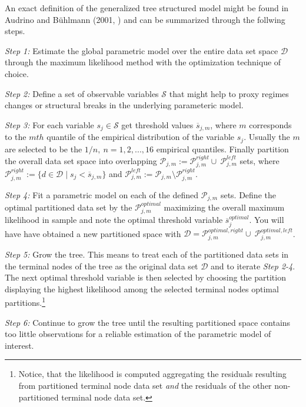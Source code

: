 An exact definition of the generalized tree structured
model might be found in Audrino and B{\"u}hlmann (2001,
\cite{AudrinoBuhlmann}) and can be summarized through the follwing
steps.\\

\setlength{\leftskip}{1cm}
\setlength{\rightskip}{1cm}

\textit{Step 1:} Estimate the global parametric model over the entire
data set space $\mathcal{D}$ through the maximum likelihood method
with the optimization technique of choice.

\textit{Step 2:} Define a set of observable variables $\mathcal{S}$
that might help to proxy regimes changes or structural breaks in the
underlying parameteric model.

\textit{Step 3:} For each variable $s_j \in \mathcal{S}$
get threshold values $\overline{s}_{j,m}$, where $m$ corresponds to
the $mth$ quantile of the empirical distribution of the variable $s_j$.
Usually the $m$ are selected to be the $1/n, \ n = 1, 2, ..., 16$
empirical quantiles. Finally partition the overall data set space into
overlapping
$\mathcal{P}_{j,m} := \mathcal{P}_{j,m}^{right} \cup \
\mathcal{P}_{j,m}^{left}$ sets, where
$\mathcal{P}_{j,m}^{right}:= \{d \in \mathcal{D} \mid s_j <
\overline{s}_{j,m}\}$ and
$\mathcal{P}_{j,m}^{left} := \mathcal{P}_{j,m} \setminus
\mathcal{P}_{j,m}^{right}$.

\textit{Step 4:} Fit a parametric model on each of the defined
$\mathcal{P}_{j,m}$ sets. Define the optimal partitioned data set by
the $\mathcal{P}_{j,m}^{optimal}$ maximizing the overall maximum likelihood in
sample and note the optimal threshold variable $\overline{s}_j^{optimal}$. You
will have have obtained a new partitioned space with
$\mathcal{D} = \mathcal{P}_{j,m}^{optimal, right} \cup \
\mathcal{P}_{j,m}^{optimal, left}$.

\textit{Step 5:} Grow the tree. This means to treat each of the
partitioned data sets in the terminal nodes of the tree as the
original data set $\mathcal{D}$ and to iterate \textit{Step 2-4}. The
next optimal threshold variable is then selected by choosing the
partition displaying the highest likelihood among the selected
terminal nodes optimal partitions.\footnote{Notice, that the likelihood is
computed aggregating the residuals resulting from partitioned terminal
node data set \textit{and} the residuals of the other non-partitioned
terminal node data set.}

\textit{Step 6:} Continue to grow the tree until the
resulting partitioned space contains too little observations for a
reliable estimation of the parametric model of interest.

